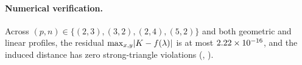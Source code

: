 \paragraph{Numerical verification.}
Across $(p,n) \in \{(2,3), (3,2), (2,4), (5,2)\}$ and both geometric and linear
profiles, the residual $\max_{x,y} \lvert K - f(\lambda)\rvert$ is at most
$2.22 \times 10^{-16}$, and the induced distance has zero strong-triangle violations
(,
).
